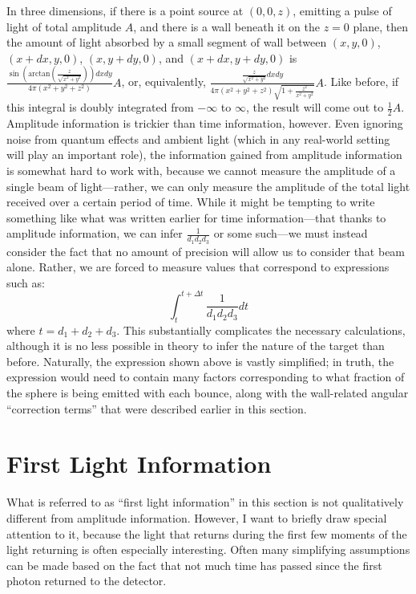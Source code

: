\documentclass[11pt]{article}
\begin{document}
In three dimensions, if there is a point source at $(0, 0, z)$, emitting a pulse of light of total amplitude $A$, and there is a wall beneath it on the $z = 0$ plane, then the amount of light absorbed by a small segment of wall between $(x, y, 0)$, $(x+dx, y, 0)$, $(x, y+dy, 0)$, and $(x+dx, y+dy, 0)$ is $\frac{\sin(\mathrm{arctan}(\frac{z}{\sqrt{x^2 + y^2}})) dx dy}{4 \pi (x^2+y^2+z^2)}A$, or, equivalently, $\frac{\frac{z}{\sqrt{x^2+y^2}} dx dy}{4 \pi (x^2+y^2+z^2) \sqrt{1+\frac{z^2}{x^2+y^2}}}A$. Like before, if this integral is doubly integrated from $-\infty$ to $\infty$, the result will come out to $\frac{1}{2}A$. \\

Amplitude information is trickier than time information, however. Even ignoring noise from quantum effects and ambient light (which in any real-world setting will play an important role), the information gained from amplitude information is somewhat hard to work with, because we cannot measure the amplitude of a single beam of light---rather, we can only measure the amplitude of the total light received over a certain period of time. While it might be tempting to write something like what was written earlier for time information---that thanks to amplitude information, we can infer $\frac{1}{d_1d_2d_3}$ or some such---we must instead consider the fact that no amount of precision will allow us to consider that beam alone. Rather, we are forced to measure values that correspond to expressions such as: \\

$$\int_t^{t+\Delta t} \frac{1}{d_1d_2d_3} dt$$ where $t = d_1 + d_2 + d_3$. This substantially complicates the necessary calculations, although it is no less possible in theory to infer the nature of the target than before. Naturally, the expression shown above is vastly simplified; in truth, the expression would need to contain many factors corresponding to what fraction of the sphere is being emitted with each bounce, along with the wall-related angular ``correction terms'' that were described earlier in this section.\\

\section{First Light Information}

What is referred to as ``first light information'' in this section is not qualitatively different from amplitude information. However, I want to briefly draw special attention to it, because the light that returns during the first few moments of the light returning is often especially interesting. Often many simplifying assumptions can be made based on the fact that not much time has passed since the first photon returned to the detector. \\
\end{document}
